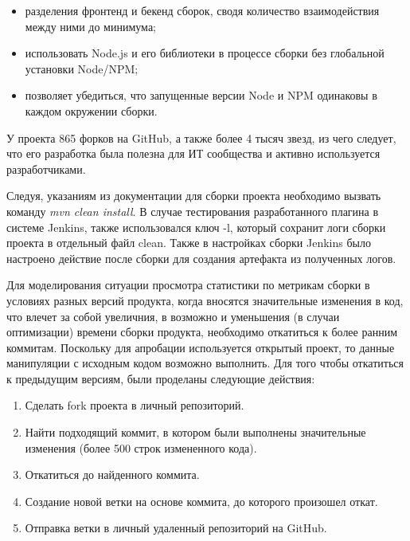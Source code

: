 \begin{itemize}
	\item разделения фронтенд и бекенд сборок, сводя количество взаимодействия между ними до минимума;
	\item использовать Node.js и его библиотеки в процессе сборки без глобальной установки Node/NPM;
	\item позволяет убедиться, что запущенные версии Node и NPM одинаковы в каждом окружении сборки.
\end{itemize}

У проекта 865 форков на GitHub, а также более 4 тысяч звезд, из чего следует, что его разработка была полезна для ИТ сообщества и активно используется разработчиками.

Следуя, указаниям из документации для сборки проекта необходимо вызвать команду \textit{mvn clean install}. В случае тестирования разработанного плагина  в системе Jenkins, также использовался ключ -l, который сохранит логи сборки проекта в отдельный файл clean. Также в настройках сборки Jenkins было настроено действие после сборки для создания артефакта из полученных логов.

Для моделирования ситуации просмотра статистики по метрикам сборки в условиях разных версий продукта, когда вносятся значительные изменения в код, что влечет за собой увеличния, в возможно и уменьшения (в случаи оптимизации) времени сборки продукта, необходимо откатиться к более ранним коммитам. Поскольку для апробации используется открытый проект, то данные манипуляции с исходным кодом возможно выполнить. Для того чтобы откатиться к предыдущим версиям, были проделаны следующие действия:

\begin{enumerate}
	\item Сделать fork проекта в личный репозиторий.
	
	\item Найти подходящий коммит, в котором были выполнены значительные изменения (более 500 строк измененного кода).
	
	\item Откатиться до найденного коммита.
	
	\item Создание новой ветки на основе коммита, до которого произошел откат.
	
	\item Отправка ветки в личный удаленный репозиторий на GitHub.
	
\end{enumerate}

